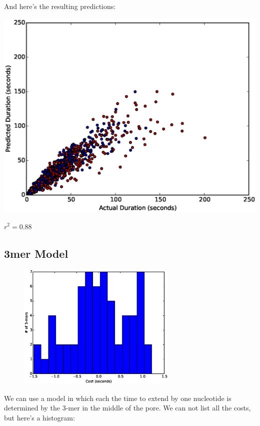         \vspace{1.5in}

        And here's the resulting predictions:
        
\includegraphics[width=\textwidth]{part11scatter2mer}

$r^2=0.88$


        \newpage
        \subsection*{3mer Model}
        \begin{figure}
        \vspace{-50pt}
        \includegraphics[width=3in]{part11hist3}
        \vspace{-70pt}
        \end{figure}
        We can use a model in which each the time to extend by one nucleotide is determined by the 3-mer in the middle of the
        pore.  We can not list all the costs, but here's a histogram:

